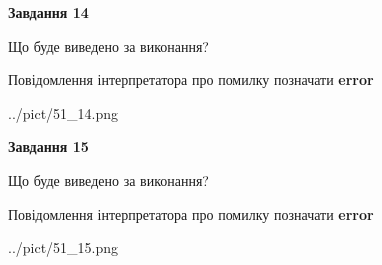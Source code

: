 \documentclass[11pt, ukrainian]{article}
\begin{document}
{\begin {large}
{\begin {center}\textbf{Завдання 14}\end {center}}\par
Що буде виведено за виконання? \par
Повідомлення інтерпретатора про помилку позначати \textbf{error}

\begin{center}
	{../pict/51_14.png}
\end{center}
\newpage

{\begin {center}\textbf{Завдання 15}\end {center}}\par
Що буде виведено за виконання? \par
Повідомлення інтерпретатора про помилку позначати \textbf{error}

\begin{center}
	{../pict/51_15.png}
\end{center}
\newpage

\end {large}}
\end{document}
